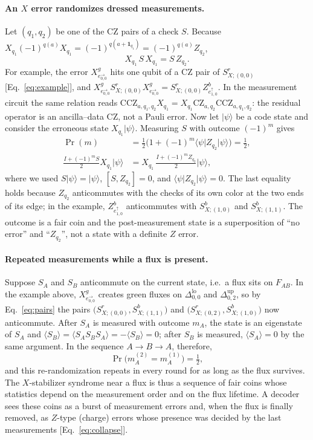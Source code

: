 \documentclass[a4paper]{article}
\newcommand{\rd}{r}
\newcommand{\gr}{g}
\newcommand{\bl}{b}
\providecommand{\ket}[1]{\ensuremath{|#1\rangle}}
\providecommand{\bra}[1]{\ensuremath{\langle#1|}}
\newcommand{\eh}[1]{e^{\rightarrow}_{#1}}   %
\newcommand{\ev}[1]{e^{\uparrow}_{#1}}      %
\newcommand{\tlo}[1]{\Delta^{\mathrm{lo}}_{#1}}
\newcommand{\tup}[1]{\Delta^{\mathrm{up}}_{#1}}
\begin{document}
\paragraph{An $X$ error randomizes dressed measurements.}
Let $(q_1,q_2)$ be one of the CZ pairs of a check $S$. Because $X_{q_1}(-1)^{q(a)}X_{q_1}=(-1)^{q(a+\mathbf 1_{q_1})}=(-1)^{q(a)}Z_{q_2}$,
\begin{equation}
  X_{q_1}\,S\,X_{q_1}=S\,Z_{q_2}.
  \label{eq:dress}
\end{equation}
For example, the error $X^\gr_{\eh{0,0}}$ hits one qubit of a CZ pair of $S^\rd_{X;(0,0)}$ [Eq.~\eqref{eq:example}], and $X^\gr_{\eh{0,0}}S^\rd_{X;(0,0)}X^\gr_{\eh{0,0}}=S^\rd_{X;(0,0)}Z^\bl_{\ev{1,0}}$. In the measurement circuit the same relation reads $\mathrm{CCZ}_{a,q_1,q_2}X_{q_1}=X_{q_1}\mathrm{CZ}_{a,q_2}\mathrm{CCZ}_{a,q_1,q_2}$: the residual operator is an ancilla--data CZ, not a Pauli error. Now let $\ket{\psi}$ be a code state and consider the erroneous state $X_{q_1}\ket{\psi}$. Measuring $S$ with outcome $(-1)^m$ gives
\begin{align}
  \Pr(m)&=\tfrac12\big(1+(-1)^m\bra{\psi}Z_{q_2}\ket{\psi}\big)=\tfrac12,\\
  \frac{I+(-1)^mS}{2}X_{q_1}\ket{\psi}&=X_{q_1}\,\frac{I+(-1)^mZ_{q_2}}{2}\ket{\psi},
  \label{eq:collapse}
\end{align}
where we used $S\ket{\psi}=\ket{\psi}$, $[S,Z_{q_2}]=0$, and $\bra{\psi}Z_{q_2}\ket{\psi}=0$. The last equality holds because $Z_{q_2}$ anticommutes with the checks of its own color at the two ends of its edge; in the example, $Z^\bl_{\ev{1,0}}$ anticommutes with $S^\bl_{X;(1,0)}$ and $S^\bl_{X;(1,1)}$. The outcome is a fair coin and the post-measurement state is a superposition of ``no error'' and ``$Z_{q_2}$'', not a state with a definite $Z$ error.

\paragraph{Repeated measurements while a flux is present.}
Suppose $S_A$ and $S_B$ anticommute on the current state, i.e.\ a flux sits on $F_{AB}$. In the example above, $X^\gr_{\eh{0,0}}$ creates green fluxes on $\tlo{0,0}$ and $\tup{0,2}$, so by Eq.~\eqref{eq:pairs} the pairs $\big(S^\rd_{X;(0,0)},S^\bl_{X;(1,1)}\big)$ and $\big(S^\rd_{X;(0,2)},S^\bl_{X;(1,0)}\big)$ now anticommute. After $S_A$ is measured with outcome $m_A$, the state is an eigenstate of $S_A$ and $\langle S_B\rangle=\langle S_AS_BS_A\rangle=-\langle S_B\rangle=0$; after $S_B$ is measured, $\langle S_A\rangle=0$ by the same argument. In the sequence $A\to B\to A$, therefore,
\begin{equation}
  \Pr\big(m_A^{(2)}=m_A^{(1)}\big)=\tfrac12,
  \label{eq:aba}
\end{equation}
and this re-randomization repeats in every round for as long as the flux survives. The $X$-stabilizer syndrome near a flux is thus a sequence of fair coins whose statistics depend on the measurement order and on the flux lifetime. A decoder sees these coins as a burst of measurement errors and, when the flux is finally removed, as $Z$-type (charge) errors whose presence was decided by the last measurements [Eq.~\eqref{eq:collapse}].
\end{document}
